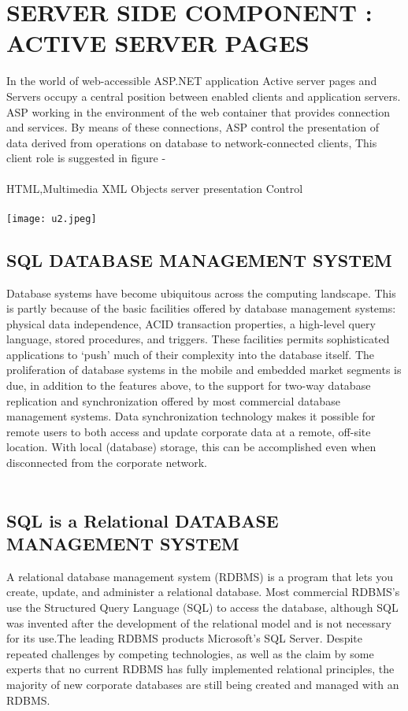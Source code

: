 \documentclass{article}
\begin{document}
\section*{SERVER SIDE COMPONENT : ACTIVE SERVER PAGES}
In the world of web-accessible ASP.NET application Active server pages and Servers occupy a central position between enabled clients and application servers. ASP working in the environment of the web container that provides connection and services. By means of these connections, ASP control the presentation of data derived from operations on database to network-connected clients, This client role is suggested in figure - 
\\
\\
HTML,Multimedia XML Objects server presentation Control
\\
\\
\texttt{[image: u2.jpeg]}
\begin{center}
   \section*{\textbf{SQL DATABASE MANAGEMENT SYSTEM}} 
\end{center}
Database systems have become ubiquitous across the computing landscape. This is partly because of the basic facilities offered by database management systems: physical data independence, ACID transaction properties, a high-level query language, stored procedures, and triggers. These facilities permits sophisticated applications to ‘push’ much of their complexity into the database itself. The proliferation of database systems in the mobile and embedded market segments is due, in addition to the features above, to the support for two-way database replication and synchronization offered by most commercial database management systems. Data synchronization technology makes it possible for remote users to both access and update corporate data at a remote, off-site location. With local (database) storage, this can be accomplished even when disconnected from the corporate network.
\\
\\
\begin{center}
   \section*{\textbf{SQL is a Relational DATABASE MANAGEMENT SYSTEM}} 
\end{center}
A relational database management system (RDBMS) is a program that lets you create, update, and administer a relational database. Most commercial RDBMS's use the Structured Query Language (SQL) to access the database, although SQL was invented after the development of the relational model and is not necessary for its use.The leading RDBMS products Microsoft's SQL Server. Despite repeated challenges by competing technologies, as well as the claim by some experts that no current RDBMS has fully implemented relational principles, the majority of new corporate databases are still being created and managed with an RDBMS.
\end{document}
